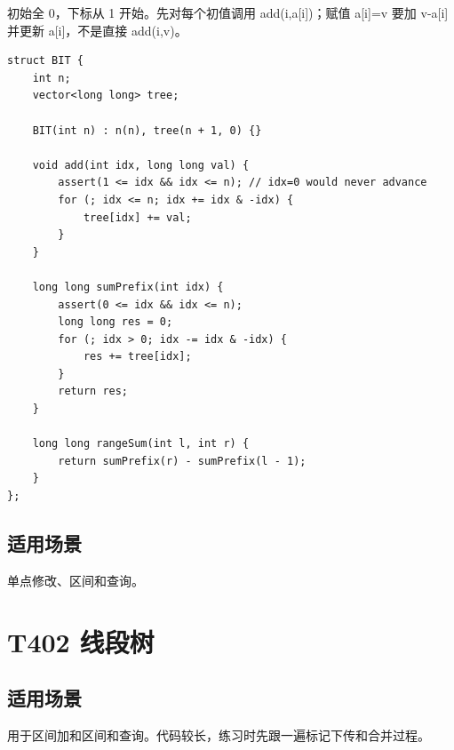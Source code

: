 初始全 0，下标从 1 开始。先对每个初值调用 add(i,a[i])；赋值 a[i]=v 要加 v-a[i] 并更新 a[i]，不是直接 add(i,v)。

\begin{lstlisting}
struct BIT {
    int n;
    vector<long long> tree;

    BIT(int n) : n(n), tree(n + 1, 0) {}

    void add(int idx, long long val) {
        assert(1 <= idx && idx <= n); // idx=0 would never advance
        for (; idx <= n; idx += idx & -idx) {
            tree[idx] += val;
        }
    }

    long long sumPrefix(int idx) {
        assert(0 <= idx && idx <= n);
        long long res = 0;
        for (; idx > 0; idx -= idx & -idx) {
            res += tree[idx];
        }
        return res;
    }

    long long rangeSum(int l, int r) {
        return sumPrefix(r) - sumPrefix(l - 1);
    }
};
\end{lstlisting}

\subsection{适用场景}

单点修改、区间和查询。

\section{T402 线段树}\label{sec:09-28}\label{tpl:402}

\subsection{适用场景}

用于区间加和区间和查询。代码较长，练习时先跟一遍标记下传和合并过程。

